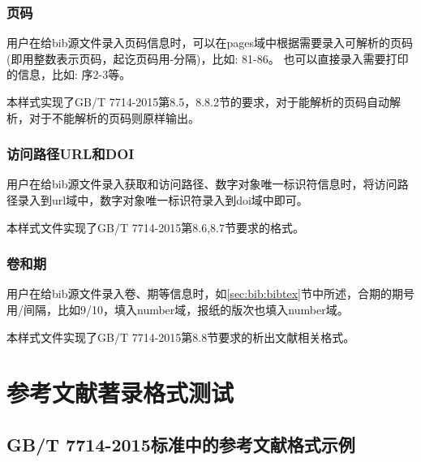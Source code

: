 \subsubsection{页码}
\begin{property}{}{}
用户在给bib源文件录入页码信息时，可以在pages域中根据需要录入可解析的页码(即用整数表示页码，起讫页码用-分隔)，比如: 81-86。 也可以直接录入需要打印的信息，比如: 序2-3等。

本样式实现了GB/T 7714-2015第8.5，8.8.2节的要求，对于能解析的页码自动解析，对于不能解析的页码则原样输出。
\end{property}

\subsubsection{访问路径URL和DOI}
\begin{property}{}{}
用户在给bib源文件录入获取和访问路径、数字对象唯一标识符信息时，将访问路径录入到url域中，数字对象唯一标识符录入到doi域中即可。

本样式文件实现了GB/T 7714-2015第8.6,8.7节要求的格式。
\end{property}

\subsubsection{卷和期}
\begin{property}{}{}
用户在给bib源文件录入卷、期等信息时，如\ref{sec:bib:bibtex}节中所述，合期的期号用/间隔，比如9/10，填入number域，报纸的版次也填入number域。

本样式文件实现了GB/T 7714-2015第8.8节要求的析出文献相关格式。
\end{property}




\section{参考文献著录格式测试}

\subsection{GB/T 7714-2015标准中的参考文献格式示例}\label{sec:eg:gb77142015}

